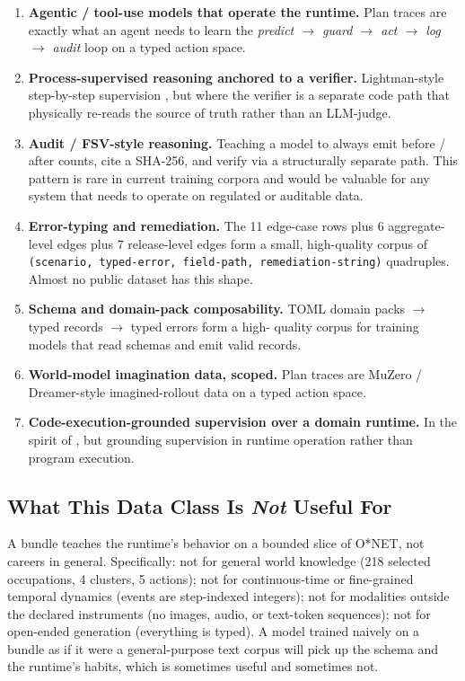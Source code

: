 \documentclass[10pt,twocolumn,letterpaper]{article}
\newcommand{\code}[1]{\texttt{\small #1}}
\begin{document}
\begin{enumerate}[leftmargin=1.2em]
\item \textbf{Agentic / tool-use models that operate the runtime.}
      Plan traces are exactly what an agent needs to learn the
      \emph{predict $\to$ guard $\to$ act $\to$ log $\to$ audit}
      loop on a typed action space.
\item \textbf{Process-supervised reasoning anchored to a verifier.}
      Lightman-style step-by-step supervision
      \cite{lightman2023verify}, but where the verifier is a
      separate code path that physically re-reads the source of
      truth rather than an LLM-judge.
\item \textbf{Audit / FSV-style reasoning.} Teaching a model to
      always emit before / after counts, cite a SHA-256, and verify
      via a structurally separate path. This pattern is rare in
      current training corpora and would be valuable for any system
      that needs to operate on regulated or auditable data.
\item \textbf{Error-typing and remediation.} The 11 edge-case rows
      plus 6 aggregate-level edges plus 7 release-level edges form
      a small, high-quality corpus of \code{(scenario, typed-error,
      field-path, remediation-string)} quadruples. Almost no public
      dataset has this shape.
\item \textbf{Schema and domain-pack composability.} TOML domain
      packs $\to$ typed records $\to$ typed errors form a high-
      quality corpus for training models that read schemas and
      emit valid records.
\item \textbf{World-model imagination data, scoped.} Plan traces
      are MuZero / Dreamer-style imagined-rollout data on a typed
      action space.
\item \textbf{Code-execution-grounded supervision over a domain
      runtime.} In the spirit of \cite{jung2025codeexec}, but
      grounding supervision in runtime operation rather than
      program execution.
\end{enumerate}

\subsection{What This Data Class Is \emph{Not} Useful For}

A bundle teaches the runtime's behavior on a bounded slice of
O*NET, not careers in general. Specifically: not for general world
knowledge (218 selected occupations, 4 clusters, 5 actions); not
for continuous-time or fine-grained temporal dynamics (events are
step-indexed integers); not for modalities outside the declared
instruments (no images, audio, or text-token sequences); not for
open-ended generation (everything is typed). A model trained
naively on a bundle as if it were a general-purpose text corpus
will pick up the schema and the runtime's habits, which is
sometimes useful and sometimes not.
\end{document}
